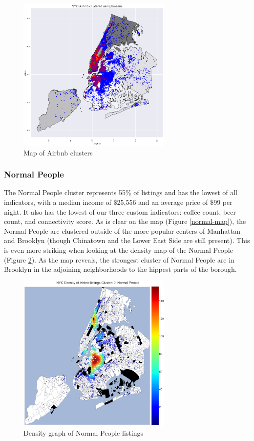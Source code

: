 \documentclass[conference]{IEEEtran}
\begin{document}
\begin{figure}[h]
\centering
\includegraphics[width=3in]{all-clusters}
\caption{Map of Airbnb clusters}
\label{cluster-map}
\end{figure}

\subsubsection{Normal People}
The Normal People cluster represents 55\% of listings and has the lowest of all indicators, with a median income of \$25,556
and an average price of \$99 per night. It also has the lowest of our three custom indicators: coffee count, beer count, 
and connectivity score. As is clear on the map (Figure \ref{normal-map}), the Normal People are clustered outside of 
the more popular centers of Manhattan and Brooklyn (though Chinatown and the Lower East Side are still present). 
This is even more striking when looking at the density map of the Normal People (Figure \ref{ClusterNormalPeople}). As the map
reveals, the strongest cluster of Normal People are in Brooklyn in the adjoining neighborhoods to the hippest parts of the
borough.

\begin{figure}[h]
\centering
\includegraphics[width=3in]{ClusterNormalPeople}
\caption{Density graph of Normal People listings}
\label{ClusterNormalPeople}
\end{figure}
\end{document}
